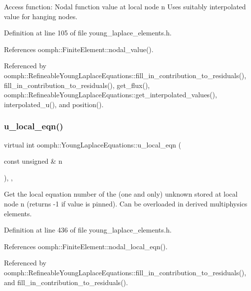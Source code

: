 Access function\+: Nodal function value at local node n Uses suitably interpolated value for hanging nodes. 

Definition at line 105 of file young\+\_\+laplace\+\_\+elements.\+h.



References oomph\+::\+Finite\+Element\+::nodal\+\_\+value().



Referenced by oomph\+::\+Refineable\+Young\+Laplace\+Equations\+::fill\+\_\+in\+\_\+contribution\+\_\+to\+\_\+residuals(), fill\+\_\+in\+\_\+contribution\+\_\+to\+\_\+residuals(), get\+\_\+flux(), oomph\+::\+Refineable\+Young\+Laplace\+Equations\+::get\+\_\+interpolated\+\_\+values(), interpolated\+\_\+u(), and position().

\mbox{\label{classoomph_1_1YoungLaplaceEquations_a60c1e853d0f03470caec1b76c8fa9226}} 
\subsubsection{\texorpdfstring{u\+\_\+local\+\_\+eqn()}{u\_local\_eqn()}}
{\footnotesize\ttfamily virtual int oomph\+::\+Young\+Laplace\+Equations\+::u\+\_\+local\+\_\+eqn (\begin{DoxyParamCaption}\item[{const unsigned \&}]{n }\end{DoxyParamCaption})\hspace{0.3cm}{\ttfamily [inline]}, {\ttfamily [protected]}, {\ttfamily [virtual]}}



Get the local equation number of the (one and only) unknown stored at local node n (returns -\/1 if value is pinned). Can be overloaded in derived multiphysics elements. 



Definition at line 436 of file young\+\_\+laplace\+\_\+elements.\+h.



References oomph\+::\+Finite\+Element\+::nodal\+\_\+local\+\_\+eqn().



Referenced by oomph\+::\+Refineable\+Young\+Laplace\+Equations\+::fill\+\_\+in\+\_\+contribution\+\_\+to\+\_\+residuals(), and fill\+\_\+in\+\_\+contribution\+\_\+to\+\_\+residuals().

